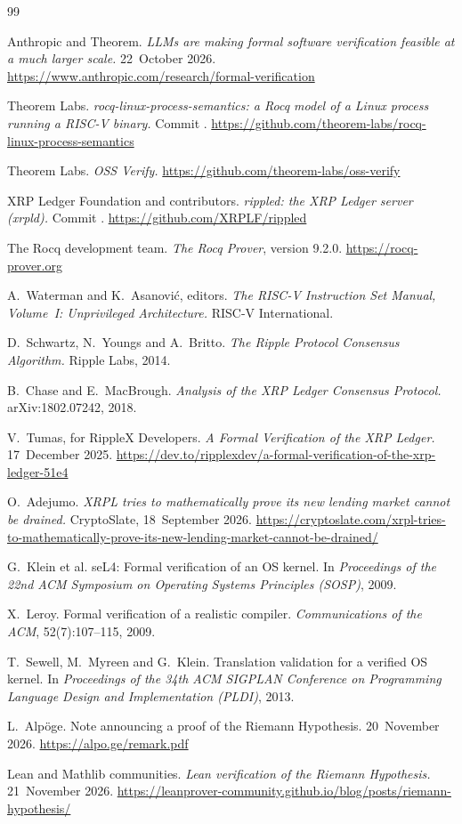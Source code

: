 \documentclass[11pt,a4paper]{article}
\newcommand{\code}[1]{\texttt{\upshape\detokenize{#1}}}
\theoremstyle{definition}
\begin{document}
\begin{thebibliography}{99}\small\raggedright
\setlength{\itemsep}{1pt}

 Anthropic and Theorem. \emph{LLMs are making formal
software verification feasible at a much larger scale.} 22~October 2026.
\url{https://www.anthropic.com/research/formal-verification}

 Theorem Labs. \emph{rocq-linux-process-semantics: a Rocq model
of a Linux process running a RISC-V binary.} Commit \code{d3f3a701}.
\url{https://github.com/theorem-labs/rocq-linux-process-semantics}

 Theorem Labs. \emph{OSS Verify.}
\url{https://github.com/theorem-labs/oss-verify}

 XRP Ledger Foundation and contributors. \emph{rippled: the
XRP Ledger server (xrpld).} Commit \code{82217fbd}.
\url{https://github.com/XRPLF/rippled}

 The Rocq development team. \emph{The Rocq Prover}, version
9.2.0. \url{https://rocq-prover.org}

 A.~Waterman and K.~Asanovi\'c, editors. \emph{The RISC-V
Instruction Set Manual, Volume~I: Unprivileged Architecture.} RISC-V
International.

 D.~Schwartz, N.~Youngs and A.~Britto. \emph{The Ripple
Protocol Consensus Algorithm.} Ripple Labs, 2014.

 B.~Chase and E.~MacBrough. \emph{Analysis of the XRP Ledger
Consensus Protocol.} arXiv:1802.07242, 2018.

 V.~Tumas, for RippleX Developers. \emph{A Formal
Verification of the XRP Ledger.} 17~December 2025.
\url{https://dev.to/ripplexdev/a-formal-verification-of-the-xrp-ledger-51e4}

 O.~Adejumo. \emph{XRPL tries to mathematically prove
its new lending market cannot be drained.} CryptoSlate, 18~September 2026.
\url{https://cryptoslate.com/xrpl-tries-to-mathematically-prove-its-new-lending-market-cannot-be-drained/}

 G.~Klein et al. seL4: Formal verification of an OS kernel. In
\emph{Proceedings of the 22nd ACM Symposium on Operating Systems Principles
(SOSP)}, 2009.

 X.~Leroy. Formal verification of a realistic compiler.
\emph{Communications of the ACM}, 52(7):107--115, 2009.

 T.~Sewell, M.~Myreen and G.~Klein. Translation validation
for a verified OS kernel. In \emph{Proceedings of the 34th ACM SIGPLAN
Conference on Programming Language Design and Implementation (PLDI)}, 2013.

 L.~Alp\"oge. Note announcing a proof of the Riemann
Hypothesis. 20~November 2026. \url{https://alpo.ge/remark.pdf}

 Lean and Mathlib communities. \emph{Lean verification of
the Riemann Hypothesis.} 21~November 2026.
\url{https://leanprover-community.github.io/blog/posts/riemann-hypothesis/}

\end{thebibliography}
\end{document}
